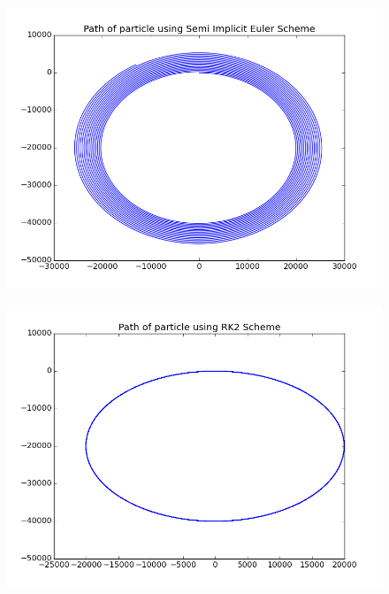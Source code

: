 \documentclass[11pt, a4paper]{article}
\begin{document}
\begin{figure}[H]
 \centering
 \includegraphics[width = \textwidth]{q1_path_euler2.png}
\end{figure}
\begin{figure}[H]
 \centering
 \includegraphics[width = \textwidth]{q1_path_RK2.png}
\end{figure}
\end{document}
